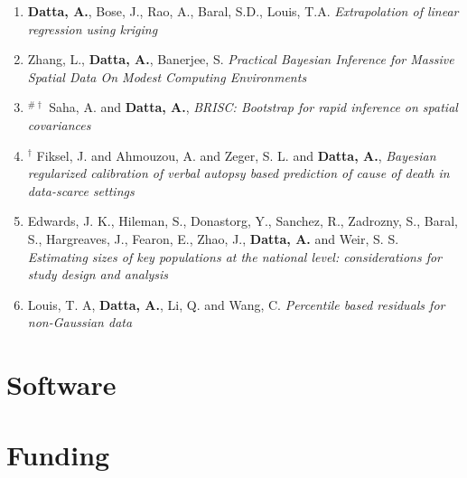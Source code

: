 \documentclass[11pt,a4paper,sans]{moderncv} %
\begin{document}
{\begin{enumerate}
\noindent \section{Working Papers}

\item \vskip 4mm \textbf{Datta, A.}, Bose, J., Rao, A., Baral, S.D., Louis, T.A. {\em Extrapolation of linear regression using kriging}

\item \vskip 4mm Zhang, L., \textbf{Datta, A.}, Banerjee, S. {\em Practical Bayesian Inference for Massive Spatial Data On Modest Computing Environments}

\item \vskip 4mm $^{\# \dagger}$ Saha, A. and \textbf{Datta, A.}, {\em BRISC: Bootstrap for rapid inference on spatial covariances}

\item  \vskip 4mm $^{\dagger}$ Fiksel, J. and Ahmouzou, A. and Zeger, S. L. and \textbf{Datta, A.}, {\em Bayesian regularized calibration of verbal autopsy based prediction of cause of death in data-scarce settings}

\item \vskip 4mm Edwards, J. K., Hileman, S., Donastorg, Y., Sanchez, R., Zadrozny, S., Baral, S., Hargreaves, J., Fearon, E., Zhao, J., \textbf{Datta, A.} and Weir, S. S.
{\em Estimating sizes of key populations at the national level: considerations for study design and analysis}

\item \vskip 4mm Louis, T. A, \textbf{Datta, A.}, Li, Q. and Wang, C. {\em Percentile based residuals for non-Gaussian data}
\end{enumerate}

\section{Software}

\section{Funding}

\vskip 4mm

}
\end{document}
